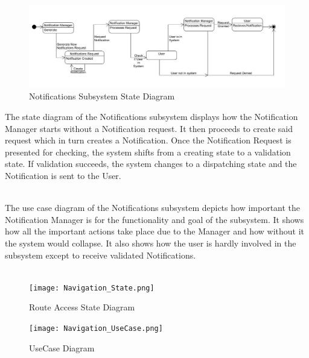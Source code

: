 \documentclass{article}
\begin{document}
				\begin{figure}[h!]
					\includegraphics[scale=0.5]{Diagrams/State_Diagram_Notifications.JPG}
					\caption{Notifications Subsystem State Diagram}	
				\end{figure}
				{The state diagram of the Notifications subsystem displays how the Notification Manager starts without a Notification request. It then proceeds to create said request which in turn creates a Notification. Once the Notification Request is presented for checking, the system shifts from a creating state to a validation state. If validation succeeds, the system changes to a dispatching state and the Notification is sent to the User.\\\\}
				
				{The use case diagram of the Notifications subsystem depicts how important the Notification Manager is for the functionality and goal of the subsystem. It shows how all the important actions take place due to the Manager and how without it the system would collapse. It also shows how the user is hardly involved in the subsystem except to receive validated Notifications.\\\\}
				
				\begin{figure}[H]
                     \texttt{[image: Navigation\_State.png]}
                     \caption{Route Access State Diagram}
					 \label{fig:navigation_state}
			    \end{figure}
			    
			    \begin{figure}[H]
                     \texttt{[image: Navigation\_UseCase.png]}
                     \caption{UseCase Diagram}
					 \label{fig:navigation_UseCase}
			    \end{figure}
\end{document}
